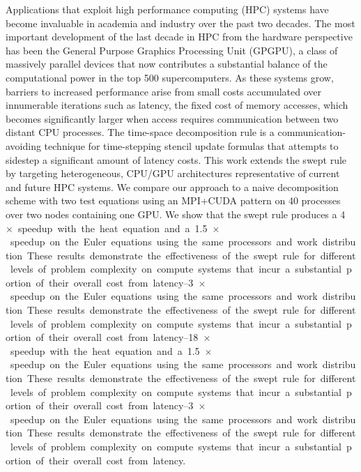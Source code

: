 
Applications that exploit high performance computing (HPC) systems have become invaluable in academia and industry over the past two decades.
The most important development of the last decade in HPC from the hardware perspective has been the General Purpose Graphics Processing Unit (GPGPU), a class of massively parallel devices that now contributes a substantial balance of the computational power in the top 500 supercomputers.
As these systems grow, barriers to increased performance arise from small costs accumulated over innumerable iterations such as latency, the fixed cost of memory accesses, which becomes significantly larger when access requires communication between two distant CPU processes.
The time-space decomposition rule is a communication-avoiding technique for time-stepping stencil
update formulas that attempts to sidestep a significant amount of latency costs.
This work extends the swept rule by targeting heterogeneous, CPU\slash GPU architectures
representative of current and future HPC systems.
We compare our approach to a naive decomposition scheme with two test equations using an MPI+CUDA pattern on 40 processes over two nodes containing one GPU.
We show that the swept rule produces a \SIrange{4}{18}{$\times$} speedup with the heat equation and a \SIrange{1.5}{3}{$\times$} speedup on the Euler equations using the same processors and work distribution.
These results demonstrate the effectiveness of the swept rule for different levels of problem complexity on compute systems that incur a substantial portion of their overall cost from latency.
